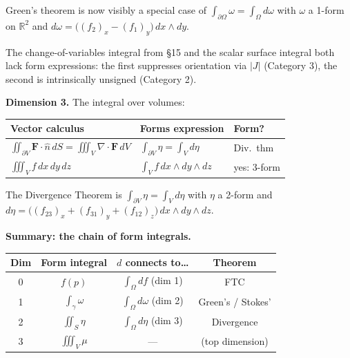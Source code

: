 \documentclass[11pt]{report}
\newcommand{\R}{\mathbb{R}}
\begin{document}
Green's theorem is now visibly a special case of $\int_{\partial \Omega} \omega = \int_\Omega d\omega$ with $\omega$ a 1-form on $\R^2$ and $d\omega = \big((f_2)_x - (f_1)_y\big)\,dx \wedge dy$.

The change-of-variables integral from \S15 and the scalar surface integral both lack form expressions: the first suppresses orientation via $|J|$ (Category 3), the second is intrinsically unsigned (Category 2).

\medskip

\noindent\textbf{Dimension 3.} The integral over volumes:

\begin{center}
\renewcommand{\arraystretch}{1.4}
\begin{tabular}{|l|l|l|}
\hline
\textbf{Vector calculus} & \textbf{Forms expression} & \textbf{Form?} \\
\hline
$\iint_{\partial V} \mathbf{F} \cdot \hat{n}\,dS = \iiint_V \nabla \cdot \mathbf{F}\,dV$ & $\int_{\partial V} \eta = \int_V d\eta$ & Div.\ thm \\
\hline
$\iiint_V f\,dx\,dy\,dz$ & $\int_V f\,dx \wedge dy \wedge dz$ & yes: 3-form \\
\hline
\end{tabular}
\end{center}

The Divergence Theorem is $\int_{\partial V} \eta = \int_V d\eta$ with $\eta$ a 2-form and $d\eta = \big((f_{23})_x + (f_{31})_y + (f_{12})_z\big)\,dx \wedge dy \wedge dz$.

\medskip

\noindent\textbf{Summary: the chain of form integrals.}

\begin{center}
\renewcommand{\arraystretch}{1.5}
\begin{tabular}{|c|c|c|c|}
\hline
\textbf{Dim} & \textbf{Form integral} & \textbf{$d$ connects to\ldots} & \textbf{Theorem} \\
\hline
0 & $f(p)$ & $\int_\Omega df$ (dim 1) & FTC \\
\hline
1 & $\int_\gamma \omega$ & $\int_\Omega d\omega$ (dim 2) & Green's / Stokes' \\
\hline
2 & $\iint_S \eta$ & $\int_\Omega d\eta$ (dim 3) & Divergence \\
\hline
3 & $\iiint_V \mu$ & --- & (top dimension) \\
\hline
\end{tabular}
\end{center}
\end{document}
